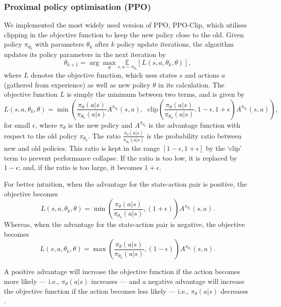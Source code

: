 \documentclass[12pt,a4paper]{article}
\begin{document}
\subsubsection{Proximal policy optimisation (PPO)}
We implemented the most widely used version of PPO, PPO-Clip, which utilises clipping in the objective function to keep the new policy close to the old. Given policy $\pi_{\theta_{k}}$ with parameters $\theta_k$ after $k$ policy update iterations, the algorithm updates its policy parameters in the next iteration by \[\theta_{k+1} = \arg \max_{\theta} \underset{s,a \sim \pi_{\theta_k}}{\mathbb{E}}\left[L(s,a,\theta_k, \theta)\right],\] where $L$ denotes the objective function, which uses states $s$ and actions $a$ (gathered from experience) as well as new policy $\theta$ in its calculation. The objective function $L$ is simply the minimum between two terms, and is given by \[L(s,a,\theta_k,\theta) = \min\left(\frac{\pi_{\theta}(a|s)}{\pi_{\theta_k}(a|s)}  A^{\pi_{\theta_k}}(s,a), \;\;\text{clip}\left(\frac{\pi_{\theta}(a|s)}{\pi_{\theta_k}(a|s)}, 1 - \epsilon, 1+\epsilon \right) A^{\pi_{\theta_k}}(s,a) \right),\] for small $\epsilon$, where $\pi_{\theta}$ is the new policy and $A^{\pi_{\theta_k}}$ is the advantage function with respect to the old policy $\pi_{\theta_{k}}$. The ratio $\frac{\pi_{\theta}(a|s)}{\pi_{\theta_k}(a|s)}$ is the probability ratio between new and old policies. This ratio is kept in the range $\left[1 - \epsilon, 1 + \epsilon \right]$ by the `clip' term to prevent performance collapse. If the ratio is too low, it is replaced by $1 - \epsilon$; and, if the ratio is too large, it becomes $1 + \epsilon$. 

For better intuition, when the advantage for the state-action pair is positive, the objective becomes \[L(s,a,\theta_k,\theta) = \min\left(\frac{\pi_{\theta}(a|s)}{\pi_{\theta_k}(a|s)}, (1 + \epsilon) \right)  A^{\pi_{\theta_k}}(s,a).\] Whereas, when the advantage for the state-action pair is negative, the objective becomes \[L(s,a,\theta_k,\theta) = \max\left(\frac{\pi_{\theta}(a|s)}{\pi_{\theta_k}(a|s)}, (1 - \epsilon) \right)  A^{\pi_{\theta_k}}(s,a).\]

A positive advantage will increase the objective function if the action becomes more likely --- i.e., \(\pi_{\theta}(a|s)\) increases --- and a negative advantage will increase the objective function if the action becomes less likely --- i.e., \(\pi_{\theta}(a|s)\) decreases \cite{SpinningUp2018}. 
\end{document}
